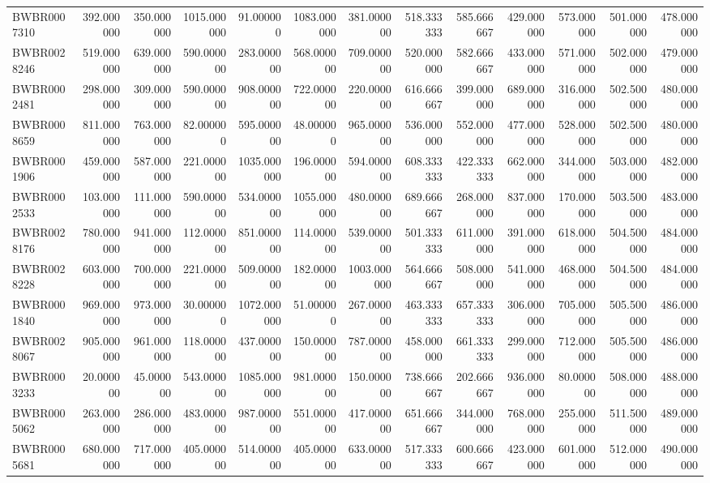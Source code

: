 \begin{longtable}{lrrrrrrrrrrrr}
BWBR0007310 & 392.000000 & 350.000000 & 1015.000000 & 91.000000 & 1083.000000 & 381.000000 & 518.333333 & 585.666667 & 429.000000 & 573.000000 & 501.000000 & 478.000000 \\
BWBR0028246 & 519.000000 & 639.000000 & 590.000000 & 283.000000 & 568.000000 & 709.000000 & 520.000000 & 582.666667 & 433.000000 & 571.000000 & 502.000000 & 479.000000 \\
BWBR0002481 & 298.000000 & 309.000000 & 590.000000 & 908.000000 & 722.000000 & 220.000000 & 616.666667 & 399.000000 & 689.000000 & 316.000000 & 502.500000 & 480.000000 \\
BWBR0008659 & 811.000000 & 763.000000 & 82.000000 & 595.000000 & 48.000000 & 965.000000 & 536.000000 & 552.000000 & 477.000000 & 528.000000 & 502.500000 & 480.000000 \\
BWBR0001906 & 459.000000 & 587.000000 & 221.000000 & 1035.000000 & 196.000000 & 594.000000 & 608.333333 & 422.333333 & 662.000000 & 344.000000 & 503.000000 & 482.000000 \\
BWBR0002533 & 103.000000 & 111.000000 & 590.000000 & 534.000000 & 1055.000000 & 480.000000 & 689.666667 & 268.000000 & 837.000000 & 170.000000 & 503.500000 & 483.000000 \\
BWBR0028176 & 780.000000 & 941.000000 & 112.000000 & 851.000000 & 114.000000 & 539.000000 & 501.333333 & 611.000000 & 391.000000 & 618.000000 & 504.500000 & 484.000000 \\
BWBR0028228 & 603.000000 & 700.000000 & 221.000000 & 509.000000 & 182.000000 & 1003.000000 & 564.666667 & 508.000000 & 541.000000 & 468.000000 & 504.500000 & 484.000000 \\
BWBR0001840 & 969.000000 & 973.000000 & 30.000000 & 1072.000000 & 51.000000 & 267.000000 & 463.333333 & 657.333333 & 306.000000 & 705.000000 & 505.500000 & 486.000000 \\
BWBR0028067 & 905.000000 & 961.000000 & 118.000000 & 437.000000 & 150.000000 & 787.000000 & 458.000000 & 661.333333 & 299.000000 & 712.000000 & 505.500000 & 486.000000 \\
BWBR0003233 & 20.000000 & 45.000000 & 543.000000 & 1085.000000 & 981.000000 & 150.000000 & 738.666667 & 202.666667 & 936.000000 & 80.000000 & 508.000000 & 488.000000 \\
BWBR0005062 & 263.000000 & 286.000000 & 483.000000 & 987.000000 & 551.000000 & 417.000000 & 651.666667 & 344.000000 & 768.000000 & 255.000000 & 511.500000 & 489.000000 \\
BWBR0005681 & 680.000000 & 717.000000 & 405.000000 & 514.000000 & 405.000000 & 633.000000 & 517.333333 & 600.666667 & 423.000000 & 601.000000 & 512.000000 & 490.000000 \\

\end{longtable}
